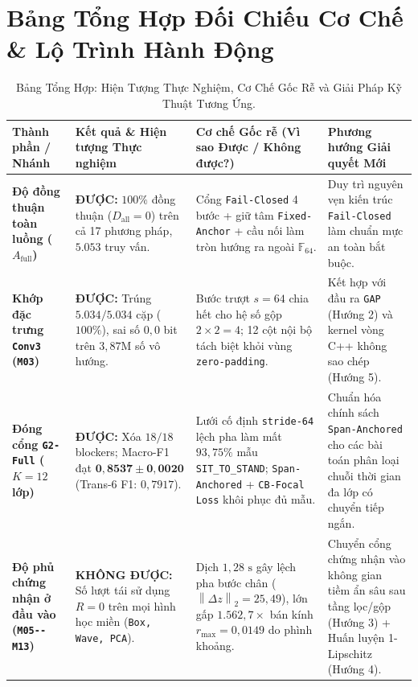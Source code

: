 \documentclass[11pt,a4paper]{article}
\newcommand{\F}{\mathbb{F}}
\newcommand{\norm}[1]{\left\lVert #1\right\rVert}
\newcommand{\code}[1]{{\small\ttfamily\nolinkurl{#1}}}
\begin{document}
\section{Bảng Tổng Hợp Đối Chiếu Cơ Chế \& Lộ Trình Hành Động}

\begin{table}[!htbp]
\centering\footnotesize
\caption{Bảng Tổng Hợp: Hiện Tượng Thực Nghiệm, Cơ Chế Gốc Rễ và Giải Pháp Kỹ Thuật Tương Ứng.}
\label{tab:summary_roadmap}
\begin{tabularx}{\linewidth}{@{}P{3.0cm}P{4.5cm}P{4.2cm}Y@{}}
\toprule
\textbf{Thành phần / Nhánh} & \textbf{Kết quả \& Hiện tượng Thực nghiệm} & \textbf{Cơ chế Gốc rễ (Vì sao Được / Không được?)} & \textbf{Phương hướng Giải quyết Mới} \\
\midrule
\textbf{Độ đồng thuận toàn luồng ($A_{\text{full}}$)} & \textcolor{okgreen}{\textbf{ĐƯỢC:}} $100\%$ đồng thuận ($D_{\text{all}}=0$) trên cả 17 phương pháp, $5.053$ truy vấn. & Cổng \code{Fail-Closed} 4 bước + giữ tâm \code{Fixed-Anchor} + cầu nối làm tròn hướng ra ngoài $\F_{64}$. & Duy trì nguyên vẹn kiến trúc \code{Fail-Closed} làm chuẩn mực an toàn bắt buộc. \\
\addlinespace[3pt]
\textbf{Khớp đặc trưng \code{Conv3} (\code{M03})} & \textcolor{okgreen}{\textbf{ĐƯỢC:}} Trúng $5.034/5.034$ cặp ($100\%$), sai số $0,0$ bit trên $3,87\text{M}$ số vô hướng. & Bước trượt $s=64$ chia hết cho hệ số gộp $2\times 2 = 4$; 12 cột nội bộ tách biệt khỏi vùng \code{zero-padding}. & Kết hợp với đầu ra \code{GAP} (Hướng 2) và kernel vòng C++ không sao chép (Hướng 5). \\
\addlinespace[3pt]
\textbf{Đóng cổng \code{G2-Full} ($K=12$ lớp)} & \textcolor{okgreen}{\textbf{ĐƯỢC:}} Xóa $18/18$ blockers; Macro-F1 đạt $\mathbf{0,8537 \pm 0,0020}$ (Trans-6 F1: $0,7917$). & Lưới cố định \code{stride-64} lệch pha làm mất $93,75\%$ mẫu \code{SIT\_TO\_STAND}; \code{Span-Anchored} + \code{CB-Focal Loss} khôi phục đủ mẫu. & Chuẩn hóa chính sách \code{Span-Anchored} cho các bài toán phân loại chuỗi thời gian đa lớp có chuyển tiếp ngắn. \\
\addlinespace[3pt]
\textbf{Độ phủ chứng nhận ở đầu vào (\code{M05--M13})} & \textcolor{warnred}{\textbf{KHÔNG ĐƯỢC:}} Số lượt tái sử dụng $R=0$ trên mọi hình học miền (\code{Box, Wave, PCA}). & Dịch $1,28\text{ s}$ gây lệch pha bước chân ($\norm{\Delta z}_2 = 25,49$), lớn gấp $1.562,7\times$ bán kính $r_{\max}=0,0149$ do phình khoảng. & Chuyển cổng chứng nhận vào không gian tiềm ẩn sâu sau tầng lọc/gộp (Hướng 3) + Huấn luyện 1-Lipschitz (Hướng 4). \\

\end{tabularx}
\end{table}
\end{document}
